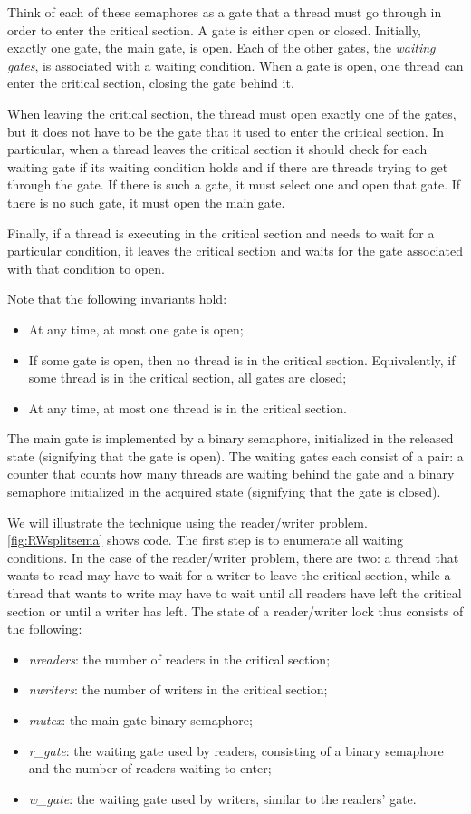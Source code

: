 \documentclass{report}
\begin{document}
{Think of each of these semaphores as a gate that a thread must go
through in order to enter the critical section.  A gate is either open
or closed.  Initially, exactly one gate, the main gate, is open.
Each of the other gates, the \emph{waiting gates}, is associated with a
waiting condition.
When a gate is open, one thread can enter the critical section,
closing the gate behind it.

When leaving the critical section, the thread must open exactly one
of the gates, but it does not have to be the gate that it used to enter
the critical section.
In particular, when a thread leaves the critical section it should
check for each waiting gate if its waiting condition holds and if there are
threads trying to get through the gate.  If there is such a gate,
it must select one and open that gate.  If there is no such gate,
it must open the main gate.

Finally, if a thread is executing in the critical section and needs to
wait for a particular condition, it leaves the critical section and waits
for the gate associated with that condition to open.

Note that the following invariants hold:
\begin{itemize}
\item At any time, at most one gate is open;
\item If some gate is open, then no thread is in the critical section.  Equivalently, if some thread is in the critical section, all gates are closed;
\item At any time, at most one thread is in the critical section.
\end{itemize}

The main gate is implemented by a binary semaphore, initialized in the
released state (signifying that the gate is open).
The waiting gates each consist of a pair: a counter that counts how many
threads are waiting behind the gate and a binary semaphore initialized
in the acquired state (signifying that the gate is closed).

We will illustrate the technique using the reader/writer problem.
\autoref{fig:RWsplitsema} shows code.
The first step is to enumerate all waiting conditions.
In the case of the reader/writer
problem, there are two: a thread that wants to read may have to wait for a
writer to leave the critical section, while a thread that wants to write may
have to wait until all readers have left the critical section or until a writer has left.
%
The state of a reader/writer lock thus consists of the following:
\begin{itemize}
\item \textit{nreaders}: the number of readers in the critical section;
\item \textit{nwriters}: the number of writers in the critical section;
\item \textit{mutex}: the main gate binary semaphore;
\item \textit{r\_gate}: the waiting gate used by readers, consisting of a binary semaphore and the number of readers waiting to enter;
\item \textit{w\_gate}: the waiting gate used by writers, similar to the readers' gate.
\end{itemize}

}
\end{document}
